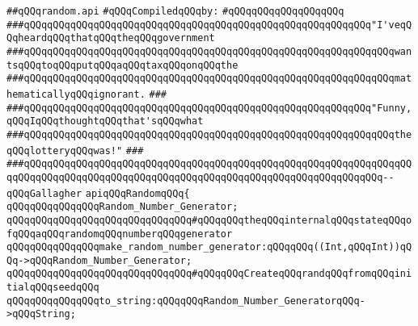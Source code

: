 \label{src/lib/src/random.api}
\verb|##qQQqrandom.api|\newline
\newline
\verb|#qQQqCompiledqQQqby:|\newline
\verb|#qQQqqQQqqQQqqQQqqQQq|\newline
\newline
\newline
\newline
\verb|###qQQqqQQqqQQqqQQqqQQqqQQqqQQqqQQqqQQqqQQqqQQqqQQqqQQqqQQqqQQq"I'veqQQqheardqQQqthatqQQqtheqQQqgovernment|\newline
\verb|###qQQqqQQqqQQqqQQqqQQqqQQqqQQqqQQqqQQqqQQqqQQqqQQqqQQqqQQqqQQqqQQqwantsqQQqtoqQQqputqQQqaqQQqtaxqQQqonqQQqthe|\newline
\verb|###qQQqqQQqqQQqqQQqqQQqqQQqqQQqqQQqqQQqqQQqqQQqqQQqqQQqqQQqqQQqqQQqmathematicallyqQQqignorant.|\newline
\verb|###|\newline
\verb|###qQQqqQQqqQQqqQQqqQQqqQQqqQQqqQQqqQQqqQQqqQQqqQQqqQQqqQQqqQQq"Funny,qQQqIqQQqthoughtqQQqthat'sqQQqwhat|\newline
\verb|###qQQqqQQqqQQqqQQqqQQqqQQqqQQqqQQqqQQqqQQqqQQqqQQqqQQqqQQqqQQqqQQqtheqQQqlotteryqQQqwas!"|\newline
\verb|###|\newline
\verb|###qQQqqQQqqQQqqQQqqQQqqQQqqQQqqQQqqQQqqQQqqQQqqQQqqQQqqQQqqQQqqQQqqQQqqQQqqQQqqQQqqQQqqQQqqQQqqQQqqQQqqQQqqQQqqQQqqQQqqQQqqQQqqQQqqQQq--qQQqGallagher|\newline
\newline
\newline
\newline
\verb|apiqQQqRandomqQQq{|\newline
\newline
\verb|qQQqqQQqqQQqqQQqRandom_Number_Generator;|\newline
\verb|qQQqqQQqqQQqqQQqqQQqqQQqqQQqqQQq#qQQqqQQqtheqQQqinternalqQQqstateqQQqofqQQqaqQQqrandomqQQqnumberqQQqgenerator|\newline
\newline
\verb|qQQqqQQqqQQqqQQqmake_random_number_generator:qQQqqQQq((Int,qQQqInt))qQQq->qQQqRandom_Number_Generator;|\newline
\verb|qQQqqQQqqQQqqQQqqQQqqQQqqQQqqQQq#qQQqqQQqCreateqQQqrandqQQqfromqQQqinitialqQQqseedqQQq|\newline
\newline
\verb|qQQqqQQqqQQqqQQqto_string:qQQqqQQqRandom_Number_GeneratorqQQq->qQQqString;|\newline
